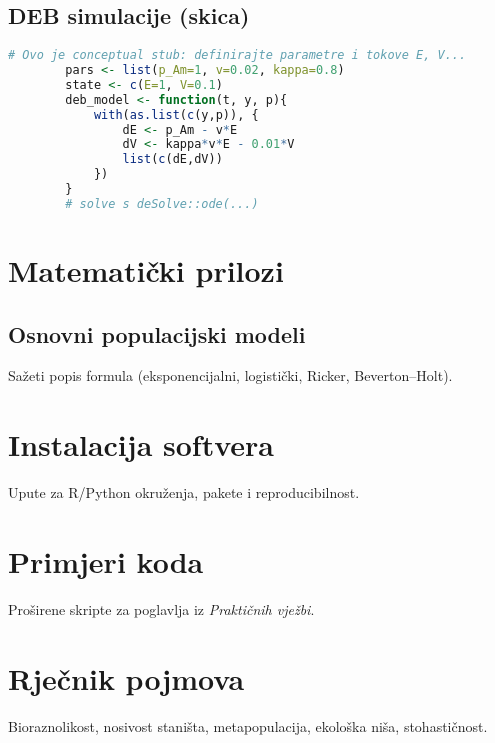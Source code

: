 \documentclass[12pt,oneside]{book}
\newcommand{\R}{\textsf{R}}
\newcommand{\Python}{\textsf{Python}}
\begin{document}
	\section{DEB simulacije (skica)}
	\begin{lstlisting}[language=R,caption={Minimalna DEB skica (konceptualno)}]
		# Ovo je conceptual stub: definirajte parametre i tokove E, V...
		pars <- list(p_Am=1, v=0.02, kappa=0.8)
		state <- c(E=1, V=0.1)
		deb_model <- function(t, y, p){
			with(as.list(c(y,p)), {
				dE <- p_Am - v*E
				dV <- kappa*v*E - 0.01*V
				list(c(dE,dV))
			})
		}
		# solve s deSolve::ode(...)
	\end{lstlisting}
	
	\appendix
	
	\chapter{Matematički prilozi}
	\section{Osnovni populacijski modeli}
	Sažeti popis formula (eksponencijalni, logistički, Ricker, Beverton--Holt).
	
	\chapter{Instalacija softvera}
	Upute za \R/\Python{} okruženja, pakete i reproducibilnost.
	
	\chapter{Primjeri koda}
	Proširene skripte za poglavlja iz \emph{Praktičnih vježbi}.
	
	\chapter{Rječnik pojmova}
	Bioraznolikost, nosivost staništa, metapopulacija, ekološka niša, stohastičnost.
	
	\backmatter
	\printbibliography
	
\end{document}

